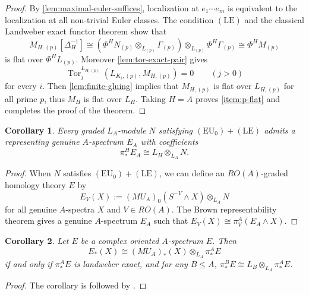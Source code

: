\documentclass[11pt,reqno]{amsart}
\newtheorem{corollary}[corollary]{Corollary}
\newcommand{\Tor}{\operatorname{Tor}}
\newcommand{\tensor}{\otimes}
\begin{document}
\begin{proof}
  By \cref{lem:maximal-euler-suffices}, localization at $e_1\cdots e_m$ is equivalent to the localization at all non-trivial Euler classes. The condition $(\mathrm{LE})$ and the classical Landweber exact functor theorem show that 
  \[
  M_{H,(p)}[\Delta_H^{-1}] \cong (\Phi^H N_{(p)} \otimes_{L_{(p)}} \Gamma_{(p)}) \otimes_{L_{(p)}} \Phi^H \Gamma_{(p)}\cong \Phi^H M_{(p)}
  \]
  is flat over $\Phi^H L_{(p)}$. Moreover \cref{lem:tor-exact-pair} gives
  \[
  \Tor_j^{L_{H,(p)}}(L_{K_i,(p)},M_{H,(p)})=0 \qquad(j>0)
  \]
  for every $i$.  Then \cref{lem:finite-gluing} implies that $M_{H,(p)}$ is flat over $L_{H,(p)}$ for all prime $p$, thus $M_H$ is flat over $L_H$.  Taking $H=A$ proves \ref{item:p-flat} and completes the proof of the theorem.
\end{proof}
\begin{corollary}\label{cor:representation}
  Every graded $L_A$-module $N$ satisfying $(\mathrm{EU}_0)+(\mathrm{LE})$ admits a representing genuine $A$-spectrum $E_A$ with coefficients
  \[
  \pi_*^H E_A \cong L_H\tensor_{L_A}N.
  \]
\end{corollary}
\begin{proof}
  When $N$ satisfies $(\mathrm{EU}_0)+(\mathrm{LE})$, we can define an $RO(A)$-graded homology theory $E$ by 
  \[
  E_V(X):= (MU_A)_0(S^{-V}\wedge X)\otimes_{L_A} N
  \]
  for all genuine $A$-spectra $X$ and $V\in RO(A)$. The Brown representability theorem \cite[Chapter XIII, Corollary 3.5]{may1996equivariant} gives a genuine $A$-spectrum $E_A$ such that $E_V(X)\cong \pi_V^A(E_A \wedge X)$. 
\end{proof}
\begin{corollary}\label{cor:spectra level representation}
  Let $E$ be a complex oriented $A$-spectrum $E$. Then 
  \[
  E_*(X) \cong (MU_A)_*(X)\otimes_{L_A} \pi_*^A E
  \]
  if and only if $\pi_*^A E$ is landweber exact, and for any $B\leq A$, $\pi_*^B E \cong L_B\otimes_{L_A} \pi_*^A E$.
\end{corollary}
\begin{proof}
  The corollary is followed by .
\end{proof}
\end{document}
